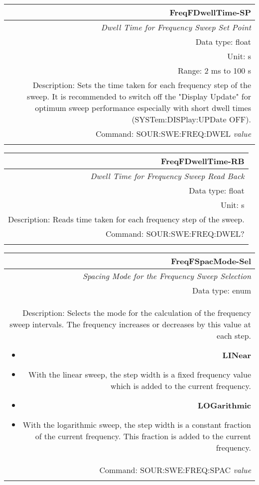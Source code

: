 \documentclass[openany]{article}
\begin{document}
		\begin{tabular}{N}
			\hline
			\bfseries FreqFDwellTime-SP \\ \hline
			\emph{Dwell Time for Frequency Sweep Set Point} \\
			Data type: float \\
			Unit: s \\
			Range: 2 ms to 100 s \\
			Description: Sets the time taken for each frequency step of the sweep. It is recommended to switch off the "Display Update" for optimum sweep performance especially with short dwell times (SYSTem:DISPlay:UPDate OFF). \\
			Command: SOUR:SWE:FREQ:DWEL \emph{value} \\
			\\
			
		\end{tabular}


		\begin{tabular}{N}
			\hline
			\bfseries FreqFDwellTime-RB \\ \hline
			\emph{Dwell Time for Frequency Sweep Read Back} \\
			Data type: float \\
			Unit: s \\
			Description: Reads time taken for each frequency step of the sweep. \\
			Command: SOUR:SWE:FREQ:DWEL? \\
			\\

		\end{tabular}


		\begin{tabular}{N}
			\hline
			\bfseries FreqFSpacMode-Sel \\ \hline
			\emph{Spacing Mode for the Frequency Sweep Selection} \\
			Data type: enum \\
			Description: Selects the mode for the calculation of the frequency sweep intervals. The frequency increases or decreases by this value at each step.\begin{itemize}[noitemsep]
				\small
				\item[] \textbf{LINear}
				\item[] With the linear sweep, the step width is a fixed frequency value which is added to the current frequency.
				\item[] \textbf{LOGarithmic}
				\item[] With the logarithmic sweep, the step width is a constant fraction of the current frequency. This fraction is added to the current frequency.
			\end{itemize} \\
			Command: SOUR:SWE:FREQ:SPAC \emph{value} \\
			\\

		\end{tabular}
\end{document}
